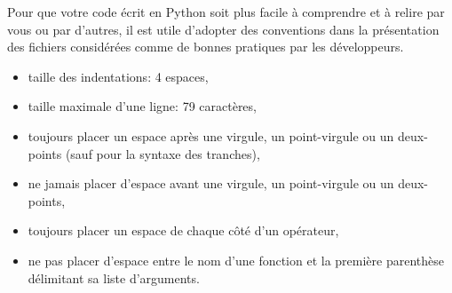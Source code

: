 Pour que votre code écrit en Python soit plus facile à comprendre et à relire par vous ou par d'autres, il est utile d'adopter des conventions dans la présentation des fichiers considérées comme de bonnes pratiques par les développeurs. 

\begin{itemize}
  \item taille des indentations: 4 espaces,
  \item  taille maximale d'une ligne: 79 caractères,
  \item toujours placer un espace après une virgule, un point-virgule ou un deux-points (sauf pour la syntaxe des tranches),
  \item ne jamais placer d'espace avant une virgule, un point-virgule ou un deux-points,
  \item toujours placer un espace de chaque côté d'un opérateur,
  \item ne pas placer d'espace entre le nom d'une fonction et la première parenthèse délimitant sa liste d'arguments.
\end{itemize}
